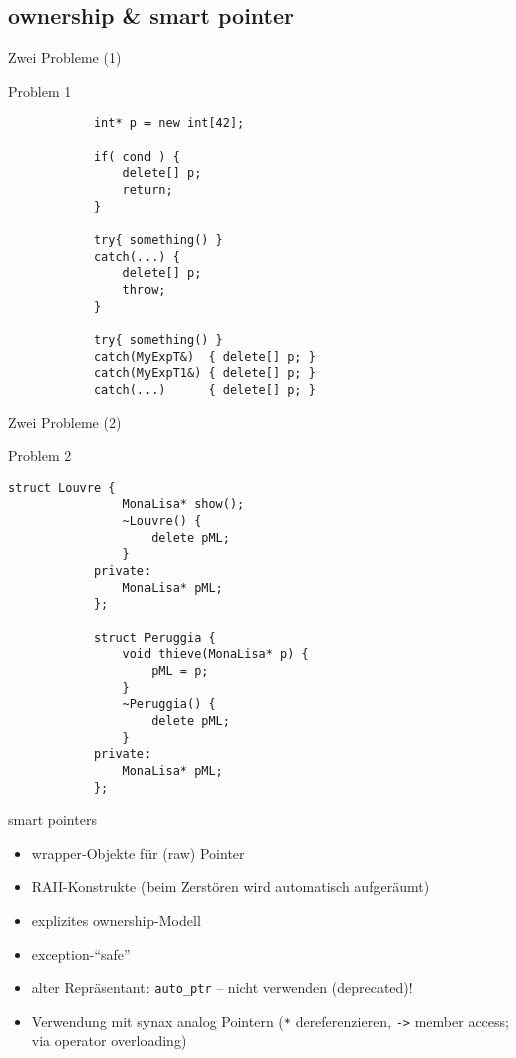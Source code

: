 \subsection{ownership \& smart pointer}

\begin{frame}[fragile]{Zwei Probleme (1)}
	\begin{block}{Problem 1}
		\begin{lstlisting}
			int* p = new int[42];
			
			if( cond ) {
			    delete[] p;
			    return;
			}
			
			try{ something() }
			catch(...) {
			    delete[] p;
			    throw;
			}
			
			try{ something() }
			catch(MyExpT&)  { delete[] p; }
			catch(MyExpT1&) { delete[] p; }
			catch(...)      { delete[] p; }
		\end{lstlisting}
	\end{block}
\end{frame}

\begin{frame}[fragile]{Zwei Probleme (2)}
	\begin{block}{Problem 2}
		\begin{lstlisting}[basicstyle=\scriptsize]
			struct Louvre {
			    MonaLisa* show();
			    ~Louvre() {
			        delete pML;
			    }
			private:
			    MonaLisa* pML;
			};
			
			struct Peruggia {
			    void thieve(MonaLisa* p) {
			        pML = p;
			    }
			    ~Peruggia() {
			        delete pML;
			    }
			private:
			    MonaLisa* pML;
			};
		\end{lstlisting}
	\end{block}
\end{frame}

\begin{frame}{ smart pointers }
	\begin{itemize}
		\item wrapper-Objekte für (raw) Pointer
		\item RAII-Konstrukte (beim Zerstören wird automatisch aufgeräumt)
		\item explizites ownership-Modell
		\item exception-\enquote{safe}
		\item alter Repräsentant: \texttt{auto\_ptr} -- nicht verwenden (deprecated)!
		\item Verwendung mit synax analog Pointern (\texttt{*} dereferenzieren, \texttt{->} member access; via operator overloading)
	\end{itemize}
\end{frame}

